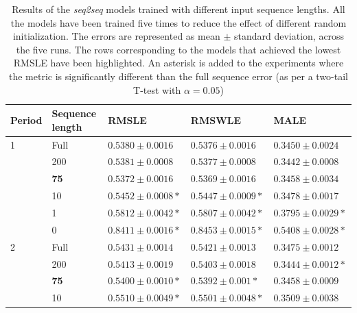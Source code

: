 	\begin{table}[h]
	\footnotesize
	\caption[Results for the sequence length ablation study]{Results of the \textit{seq2seq} models trained with different input sequence lengths. All the models have been trained five times to reduce the effect of different random initialization. The errors are represented as mean $\pm$ standard deviation, across the five runs. The rows corresponding to the models that achieved the lowest RMSLE have been highlighted. An asterisk is added to the experiments where the metric is significantly different than the full sequence error (as per a two-tail T-test with $\alpha=0.05$)}
	\label{tab:salesforecast_results_ablation_length}
	\centering
	\begin{tabular}{lllll}
		\hline
		Period & Sequence length & RMSLE                           & RMSWLE                         & MALE                           \\ \hline
		1      & Full            & $ 0.5380 \pm 0.0016 $           & $ 0.5376 \pm 0.0016 $          & $  0.3450 \pm 0.0024$          \\
      & 200             & $ 0.5381 \pm 0.0008 $           & $ 0.5377 \pm 0.0008 $          & $ 0.3442 \pm 0.0008 $          \\
      & \textbf{75}     & $ \mathbf{0.5372 \pm 0.0016} $  & $ \mathbf{0.5369 \pm 0.0016} $ & $ \mathbf{0.3458 \pm 0.0034} $ \\
      & 10              & $ 0.5452 \pm 0.0008 *$          & $ 0.5447 \pm 0.0009 *$         & $ 0.3478 \pm 0.0017 $          \\
      & 1               & $ 0.5812 \pm 0.0042 *$          & $ 0.5807 \pm 0.0042 *$         & $ 0.3795 \pm 0.0029 *$          \\
      & 0               & $ 0.8411 \pm 0.0016 *$          & $ 0.8453 \pm 0.0015 *$         & $ 0.5408 \pm 0.0028 *$          \\ \hline
		2      & Full            & $ 0.5431 \pm 0.0014 $           & $ 0.5421 \pm 0.0013 $          & $ 0.3475 \pm 0.0012 $          \\
      & 200             & $ 0.5413 \pm 0.0019 $           & $ 0.5403 \pm 0.0018 $          & $ 0.3444 \pm 0.0012 *$          \\
      & \textbf{75}     & $ \mathbf{0.5400 \pm 0.0010}* $ & $ \mathbf{0.5392 \pm 0.001}* $ & $ \mathbf{0.3458 \pm 0.0009} $ \\
      & 10              & $ 0.5510 \pm 0.0049 *$          & $ 0.5501 \pm 0.0048 *$         & $ 0.3509 \pm 0.0038 $          \\

\end{tabular}
\end{table}
